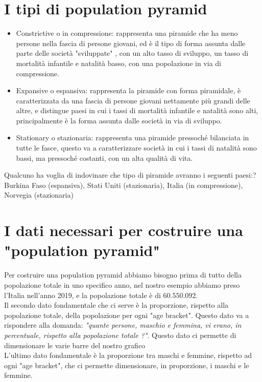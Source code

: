 \documentclass[11pt, oneside]{article}   	%
\begin{document}
\section{I tipi di population pyramid}
\begin{itemize}
\item Constrictive o in compressione: rappresenta una piramide che ha meno persone nella fascia di persone giovani, ed è il tipo di forma assunta dalle parte delle società "sviluppate" , con un alto tasso di sviluppo, un tasso di mortalità infantile e natalità basso, con una popolazione in via di compressione.
\item Expansive o espansiva: rappresenta la piramide con forma piramidale, è caratterizzata da una fascia di persone giovani nettamente più grandi delle altre, e distingue paesi in cui i tassi di mortalità infantile e natalità sono alti, principalmente è la forma assunta dalle società in via di sviluppo.
\item Stationary o stazionaria: rappresenta una piramide pressoché bilanciata in tutte le fasce, questo va a caratterizzare società in cui i tassi di natalità sono bassi, ma pressoché costanti, con un alta qualità di vita.
\end{itemize}
\footnotesize{}
Qualcuno ha voglia di indovinare che tipo di piramide avranno i seguenti paesi:?
Burkina Faso (espansiva), Stati Uniti (stazionaria), Italia (in compressione), Norvegia (stazionaria)

\normalsize{}

\begin{center}
\end{center}

\section{I dati necessari per costruire una "population pyramid"}
Per costruire una population pyramid abbiamo bisogno prima di tutto della popolazione totale in uno specifico anno, nel nostro esempio abbiamo preso l'Italia nell'anno 2019, e la popolazione totale è di $60.550.092$. \\
Il secondo dato fondamentale che ci serve è la proporzione, rispetto alla popolazione totale, della popolazione per ogni "age bracket". Questo dato va a rispondere alla domanda: \emph{"quante persone, maschio e femmina, vi erano, in percentuale, rispetto alla popolazione totale ?"}. Questo dato ci permette di dimensionare le varie barre del nostro grafico\\
L'ultimo dato fondamentale è la proporzione tra maschi e femmine, rispetto ad ogni "age bracket", che ci permette dimensionare, in proporzione, i maschi e le femmine.
\end{document}
